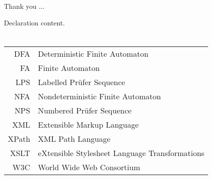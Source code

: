 \documentclass[english,bachelor,unicode,oneside]{ctufit-thesis}
\begin{document}
\frontmatter\frontmatterinit

\thispagestyle{empty}\maketitle\thispagestyle{empty}\cleardoublepage



\imprintpage
\stopTOCentries

\begin{acknowledgmentpage}
	Thank you $\dots$
\end{acknowledgmentpage}

\begin{declarationpage}
    Declaration content.
\end{declarationpage}

\printabstractpage


\tableofcontents
\listoffigures %
\begingroup
\let\clearpage\relax
\listoftables %
\thectufitlistingscommand
\endgroup

\chapter{\thectufitabbreviationlabel}

\begin{tabular}{rl}
DFA & Deterministic Finite Automaton\\
FA & Finite Automaton\\
LPS & Labelled Prüfer Sequence\\
NFA & Nondeterministic Finite Automaton\\
NPS & Numbered Prüfer Sequence\\
XML & Extensible Markup Language\\
XPath & XML Path Language\\
XSLT & eXtensible Stylesheet Language Transformations\\
W3C & World Wide Web Consortium
\end{tabular}
\end{document}
